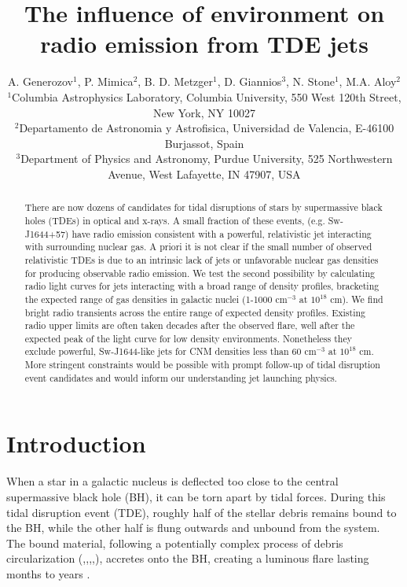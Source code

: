 \documentclass[usenatbib,fleqn]{mnras}
\title{The influence of environment on radio emission from TDE jets}
\author[Generozov et al.]{ A. Generozov$^{1}$, P. Mimica$^{2}$,
  B. D. Metzger$^{1}$,
  D. Giannios$^{3}$, 
  N. Stone$^{1}$,
  M.A. Aloy$^{2}$ 
  \\
  $^{1}$Columbia Astrophysics Laboratory, Columbia University, 550 West 120th Street, New York, NY 10027\\
  $^{2}$Departamento de Astronomia y Astrofisica, Universidad de Valencia, E-46100 Burjassot, Spain\\
  $^{3}$Department of Physics and Astronomy, Purdue University, 525
  Northwestern Avenue, West Lafayette, IN 47907, USA}
\begin{document}
\maketitle
\begin{abstract}
  There are now dozens of candidates for tidal disruptions of stars by
  supermassive black holes (TDEs) in optical and x-rays. A small
  fraction of these events, (e.g. Sw-J1644+57) have radio emission
  consistent with a powerful, relativistic jet interacting with
  surrounding nuclear gas. A priori it is not clear if the small
  number of observed relativistic TDEs is due to an intrinsic lack of jets
  or unfavorable nuclear gas densities for producing observable radio
  emission. We test the second possibility by calculating radio
  light curves for jets interacting with a broad range of density
  profiles, bracketing the expected range of gas densities in galactic
  nuclei (1-1000 cm$^{-3}$ at $10^{18}$ cm). We find bright radio
  transients across the entire range of expected density
  profiles. Existing radio upper limits are often taken decades after
  the observed flare, well after the expected peak of the light curve
  for low density environments. Nonetheless they exclude powerful,
  Sw-J1644-like jets for CNM densities less than 60 cm$^{-3}$ at
  $10^{18}$ cm. More stringent constraints would be possible with
  prompt follow-up of tidal disruption event candidates and would
  inform our understanding jet launching physics.
\end{abstract}
\section{Introduction}
\label{sec:intro}
When a star in a galactic nucleus is deflected too close to the
central supermassive black hole (BH), it can be torn apart by tidal
forces.  During this tidal disruption event (TDE), roughly half of the
stellar debris remains bound to the BH, while the other half is flung
outwards and unbound from the system.  The bound material, following a
potentially complex process of debris circularization
(\citealt{Guillochon+2013},\citealt{Hayasaki+2013},\citealt{Hayasaki+2015},\citealt{Shiokawa+2015},\citealt{Bonnerot+2015}),
accretes onto the BH, creating a luminous flare lasting months to
years \citep{Hills1975, Carter+1982, Rees1988}.
\end{document}
